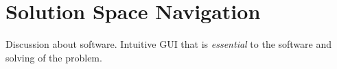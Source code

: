 \section{Solution Space Navigation}

Discussion about software. Intuitive GUI that is \textit{essential} to the software and solving of the problem.
